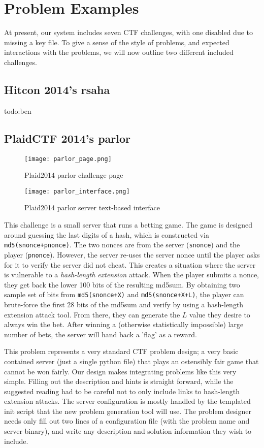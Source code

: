 \section{Problem Examples}
At present, our system includes seven CTF challenges, with one
disabled due to missing a key file. To give a sense of the style of
problems, and expected interactions with the problems, we will now
outline two different included challenges.

\subsection{Hitcon 2014's rsaha}
todo:ben
\subsection{PlaidCTF 2014's parlor}

\begin{figure}[h!]
\centering
\texttt{[image: parlor\_page.png]}
\caption{Plaid2014 parlor challenge page}\label{fig:parlor_page}
\end{figure}

\begin{figure}[h!]
\centering
\texttt{[image: parlor\_interface.png]}
\caption{Plaid2014 parlor server text-based interface}\label{fig:parlor_interface}
\end{figure}


This challenge is a small server that runs a betting game. The game is
designed around guessing the last digits of a hash, which is
constructed via \texttt{md5(snonce+pnonce)}. The two nonces are from
the server (\texttt{snonce}) and the player
(\texttt{pnonce}). However, the server re-uses the server nonce until
the player asks for it to verify the server did not cheat. This
creates a situation where the server is vulnerable to a
\textit{hash-length extension} attack. When the player submits a
nonce, they get back the lower 100 bits of the resulting md5sum. By
obtaining two sample set of bits from \texttt{md5(snonce+X)} and
\texttt{md5(snonce+X+L)}, the player can brute-force the first 28 bits
of the md5sum and verify by using a hash-length extension attack
tool. From there, they can generate the $L$ value they desire to
always win the bet. After winning a (otherwise statistically
impossible) large number of bets, the server will hand back a 'flag'
as a reward.

This problem represents a very standard CTF problem design; a very
basic contained server (just a single python file) that plays an
ostensibly fair game that cannot be won fairly. Our design makes
integrating problems like this very simple. Filling out the
description and hints is straight forward, while the suggested reading
had to be careful not to only include links to hash-length extension
attacks. The server configuration is mostly handled by the templated
init script that the new problem generation tool will use. The problem
designer needs only fill out two lines of a configuration file (with
the problem name and server binary), and write any description and
solution information they wish to include.

